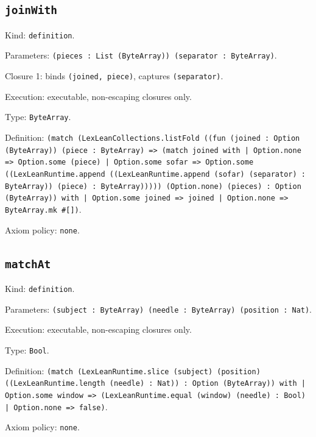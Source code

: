 \documentclass[11pt]{article}
\begin{document}
\subsection*{\texttt{joinWith}}
\noindent Kind: \texttt{definition}.\par
\noindent Parameters: \texttt{(pieces : List (ByteArray)) (separator : ByteArray)}.\par
\noindent Closure 1: binds \texttt{(joined, piece)}, captures \texttt{(separator)}.\par
\noindent Execution: executable, non-escaping closures only.\par
\noindent Type: \texttt{ByteArray}.\par
\noindent Definition: \texttt{(match (LexLeanCollections.listFold ((fun (joined : Option (ByteArray)) (piece : ByteArray) => (match joined with | Option.none => Option.some (piece) | Option.some sofar => Option.some ((LexLeanRuntime.append ((LexLeanRuntime.append (sofar) (separator) : ByteArray)) (piece) : ByteArray))))) (Option.none) (pieces) : Option (ByteArray)) with | Option.some joined => joined | Option.none => ByteArray.mk \#[])}.\par
\noindent Axiom policy: \texttt{none}.\par
\subsection*{\texttt{matchAt}}
\noindent Kind: \texttt{definition}.\par
\noindent Parameters: \texttt{(subject : ByteArray) (needle : ByteArray) (position : Nat)}.\par
\noindent Execution: executable, non-escaping closures only.\par
\noindent Type: \texttt{Bool}.\par
\noindent Definition: \texttt{(match (LexLeanRuntime.slice (subject) (position) ((LexLeanRuntime.length (needle) : Nat)) : Option (ByteArray)) with | Option.some window => (LexLeanRuntime.equal (window) (needle) : Bool) | Option.none => false)}.\par
\noindent Axiom policy: \texttt{none}.\par
\end{document}
